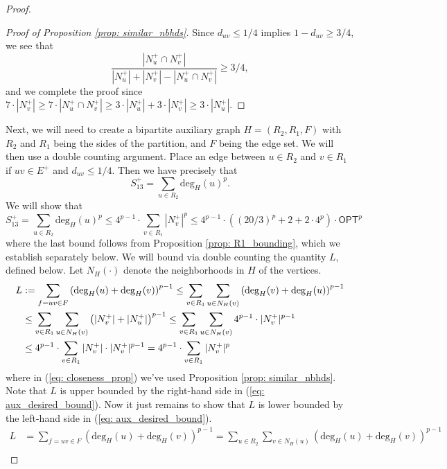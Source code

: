 \documentclass[11pt]{article}
\begin{document}
\begin{proof}
\begin{proof}[Proof of Proposition \ref{prop: similar_nbhds}]
    Since $d_{uv} \leq 1/4$ implies $1-d_{uv} \geq 3/4$, we see that
    \[\frac{|N_u^+ \cap N_v^+|}{|N_u^+| + |N_v^+| - |N_u^+ \cap N_v^+|} \geq 3/4,\]
    and we complete the proof since
    $7\cdot|N_v^+| \geq 7\cdot|N_u^+ \cap N_v^+| \geq 3\cdot|N_u^+| + 3\cdot|N_v^+| \geq 3\cdot|N_u^+|.$
\end{proof}
Next, we will need to create a bipartite auxiliary graph $H = (R_2, R_1, F)$ with $R_2$ and $R_1$ being the sides of the partition, and $F$ being the edge set. We will then use a double counting argument. Place an edge between $u \in R_2$ and $v \in R_1$ if $uv \in E^+$ and $d_{uv} \leq 1/4$. Then we have precisely that 
\[S_{13}^+ = \sum_{u \in R_2} \text{deg}_{H}(u)^p.\] 
 We will show that 
\begin{equation} \label{eq: aux_desired_bound}
  \boxed{S_{13}^+ = \sum_{u \in R_2} \text{deg}_H(u)^p \leq  4^{p-1} \cdot \sum_{v \in R_1} |N_v^+|^p \leq 4^{p-1} \cdot \left((20/3)^p + 2 + 2 \cdot 4^p \right) \cdot \textsf{OPT}^p}
\end{equation}
where the last bound  follows from Proposition \ref{prop: R1_bounding}, which we establish separately below. We will bound via double counting the quantity $L$, defined below. Let $N_H(\cdot)$ denote the neighborhoods in $H$ of the vertices. 
\begin{align}
    L &:= \sum_{f=uv \in F} \left(\text{deg}_H(u) + \text{deg}_H(v) \right)^{p-1}  
    \leq \sum_{v \in R_1} \sum_{u \in N_{H}(v)} \left(\text{deg}_H(v) + \text{deg}_H(u) \right)^{p-1} \notag \\
    &\leq \sum_{v \in R_1} \sum_{u \in N_{H}(v)} \left( |N_v^+| + |N_u^+| \right)^{p-1}  
    \leq \sum_{v \in R_1} \sum_{u \in N_{H}(v)} 4^{p-1} \cdot |N_v^+|^{p-1} \label{eq: closeness_prop} \\
    &\leq 4^{p-1} \cdot \sum_{v \in R_1} |N_v^+| \cdot |N_v^+|^{p-1} \notag 
    = 4^{p-1} \cdot \sum_{v \in R_1} |N_v^+|^p \notag
\end{align}
 where in (\ref{eq: closeness_prop}) we've used Proposition \ref{prop: similar_nbhds}. Note that $L$ is upper bounded by the right-hand side in (\ref{eq: aux_desired_bound}). Now it just remains to show that $L$ is lower bounded by the left-hand side in (\ref{eq: aux_desired_bound}).
\begin{align*}
    L &= \sum_{f=uv \in F} \left(\text{deg}_H(u) + \text{deg}_H(v) \right)^{p-1} 
    = \sum_{u \in R_2} \sum_{v \in N_H(u)} \left(\text{deg}_H(u) + \text{deg}_H(v) \right)^{p-1} \\

\end{align*}
\end{proof}
\end{document}
